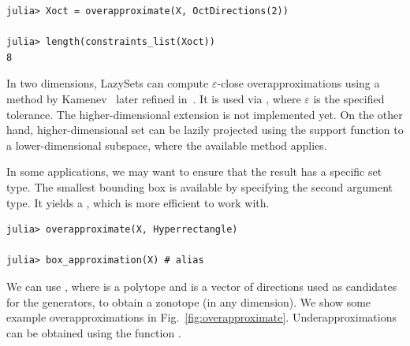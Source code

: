 \begin{minipage}{\linewidth}
\vspace{-\abovedisplayskip}
\begin{lstlisting}
julia> Xoct = overapproximate(X, OctDirections(2))

julia> length(constraints_list(Xoct))
8
\end{lstlisting}
\end{minipage}

In two dimensions, LazySets can compute $\varepsilon$-close overapproximations using a method by Kamenev~\cite{kamenev1996algorithm} later refined in~\cite{lotov2008modified}.
%
It is used via , where $\varepsilon$ is the specified tolerance.
%
The higher-dimensional extension is not implemented yet.
%
On the other hand, higher-dimensional set can be lazily projected using the support function to a lower-dimensional subspace, where the available method applies.

\smallskip

In some applications, we may want to ensure that the result has a specific set type.
The smallest bounding box is available by specifying the second argument type. It yields a , which is more efficient to work with.

\begin{minipage}{\linewidth}
	\vspace{-\abovedisplayskip}
	\begin{lstlisting}
julia> overapproximate(X, Hyperrectangle)

julia> box_approximation(X) # alias
\end{lstlisting}
\end{minipage}

We can use , where  is a polytope and  is a vector of directions used as candidates for the generators, to obtain a zonotope (in any dimension). We show some example overapproximations in Fig.~\ref{fig:overapproximate}.
Underapproximations can be obtained using the function .

